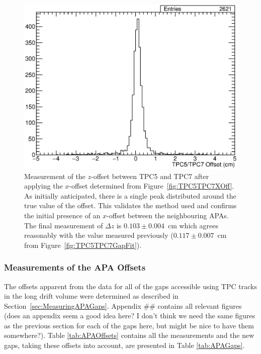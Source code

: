 \begin{figure}
  \centering
  \includegraphics[width=12cm]{TPC5TPC7ZOff.eps}
  \caption{Measurement of the $z$-offset between TPC5 and TPC7 after applying the $x$-offset determined from Figure~\ref{fig:TPC5TPC7XOff}.  As initially anticipated, there is a single peak distributed around the true value of the offset.  This validates the method used and confirms the initial presence of an $x$-offset between the neighbouring APAs.  The final measurement of $\Delta z$ is $0.103\pm0.004$~cm which agrees reasonably with the value measured previously ($0.117\pm0.007$~cm from Figure~\ref{fig:TPC5TPC7GapFit}).}
  \label{fig:TPC5TPC7ZOff}
\end{figure}

\subsubsection{Measurements of the APA Offsets}\label{sec:APAOffsetMeasurements}

The offsets apparent from the data for all of the gaps accessible using TPC tracks in the long drift volume were determined as described in Section~\ref{sec:MeasuringAPAGaps}.  Appendix \#\# contains all relevant figures {\color{red}(does an appendix seem a good idea here? I don't think we need the same figures as the previous section for each of the gaps here, but might be nice to have them somewhere?)}.  Table \ref{tab:APAOffsets} contains all the measurements and the new gaps, taking these offsets into account, are presented in Table \ref{tab:APAGaps}.

